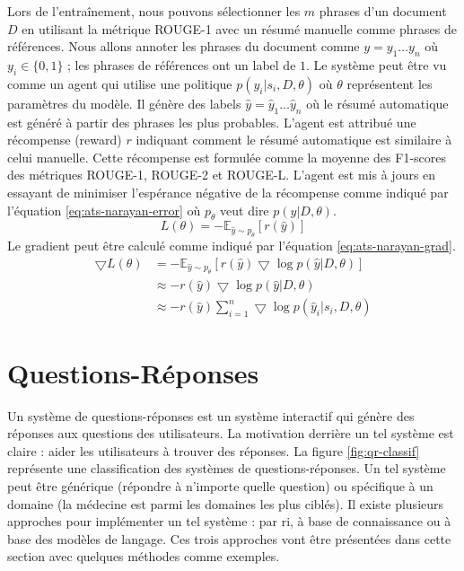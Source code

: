 \documentclass{KodeBook}
\begin{document}
Lors de l'entraînement, nous pouvons sélectionner les $m$ phrases d'un document $D$ en utilisant la métrique ROUGE-1 avec un résumé manuelle comme phrases de références.
Nous allons annoter les phrases du document comme $y = y_1 \ldots y_n$ où $y_i \in \{0, 1\}$ ; les phrases de références ont un label de $1$. 
Le système peut être vu comme un agent qui utilise une politique $p(y_i|s_i, D, \theta)$ où $\theta$ représentent les paramètres du modèle. 
Il génère des labels $\hat{y} = \hat{y}_1 \ldots \hat{y}_n$ où le résumé automatique est généré à partir des phrases les plus probables. 
L'agent est attribué une récompense (reward) $r$ indiquant comment le résumé automatique est similaire à celui manuelle. 
Cette récompense est formulée comme la moyenne des F1-scores des métriques ROUGE-1, ROUGE-2 et ROUGE-L. 
L'agent est mis à jours en essayant de minimiser l'espérance négative de la récompense comme indiqué par l'équation \ref{eq:ats-narayan-error} où $p_\theta$ veut dire $p(y|D, \theta)$.
\begin{equation}\label{eq:ats-narayan-error}
L(\theta) = - \mathbb{E}_{\hat{y} \sim p_\theta} [r(\hat{y})]
\end{equation}
Le gradient peut être calculé comme indiqué par l'équation \ref{eq:ats-narayan-grad}.
\begin{align}
\bigtriangledown L(\theta) & = - \mathbb{E}_{\hat{y} \sim p_\theta} [r(\hat{y}) \bigtriangledown \log p(\hat{y}|D, \theta)] \nonumber \\
& \approx - r(\hat{y}) \bigtriangledown \log p(\hat{y}|D, \theta) \nonumber \\
& \approx - r(\hat{y}) \sum_{i=1}^{n} \bigtriangledown \log p(\hat{y}_i|s_i, D, \theta) \label{eq:ats-narayan-grad}
\end{align}

\section{Questions-Réponses}

Un système de questions-réponses est un système interactif qui génère des réponses aux questions des utilisateurs.
La motivation derrière un tel système est claire : aider les utilisateurs à trouver des réponses.
La figure \ref{fig:qr-classif} représente une classification des systèmes de questions-réponses. 
Un tel système peut être générique (répondre à n'importe quelle question) ou spécifique à un domaine (la médecine est parmi les domaines les plus ciblés).
Il existe plusieurs approches pour implémenter un tel système : par \ac{ri}, à base de connaissance ou à base des modèles de langage.
Ces trois approches vont être présentées dans cette section avec quelques méthodes comme exemples.
\end{document}
